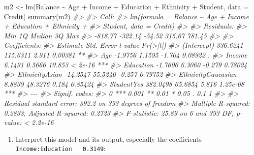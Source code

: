 \documentclass[
]{book}
\newenvironment{Shaded}{\begin{snugshade}}{\end{snugshade}}
\newcommand{\AttributeTok}[1]{\textcolor[rgb]{0.77,0.63,0.00}{#1}}
\newcommand{\CommentTok}[1]{\textcolor[rgb]{0.56,0.35,0.01}{\textit{#1}}}
\newcommand{\FunctionTok}[1]{\textcolor[rgb]{0.00,0.00,0.00}{#1}}
\newcommand{\NormalTok}[1]{#1}
\newcommand{\OtherTok}[1]{\textcolor[rgb]{0.56,0.35,0.01}{#1}}
\newcommand{\SpecialCharTok}[1]{\textcolor[rgb]{0.00,0.00,0.00}{#1}}
\providecommand{\tightlist}{%
  \setlength{\itemsep}{0pt}\setlength{\parskip}{0pt}}
\begin{document}
\begin{Shaded}
\begin{Highlighting}[]
\NormalTok{m2 }\OtherTok{\textless{}{-}} \FunctionTok{lm}\NormalTok{(Balance }\SpecialCharTok{\textasciitilde{}}\NormalTok{ Age }\SpecialCharTok{+}\NormalTok{ Income }\SpecialCharTok{+}\NormalTok{ Education }\SpecialCharTok{+}\NormalTok{ Ethnicity }\SpecialCharTok{+}\NormalTok{ Student, }\AttributeTok{data =}\NormalTok{ Credit)}
\FunctionTok{summary}\NormalTok{(m2)}
\CommentTok{\#\textgreater{} }
\CommentTok{\#\textgreater{} Call:}
\CommentTok{\#\textgreater{} lm(formula = Balance \textasciitilde{} Age + Income + Education + Ethnicity + }
\CommentTok{\#\textgreater{}     Student, data = Credit)}
\CommentTok{\#\textgreater{} }
\CommentTok{\#\textgreater{} Residuals:}
\CommentTok{\#\textgreater{}     Min      1Q  Median      3Q     Max }
\CommentTok{\#\textgreater{} {-}818.77 {-}322.14  {-}54.52  315.67  781.45 }
\CommentTok{\#\textgreater{} }
\CommentTok{\#\textgreater{} Coefficients:}
\CommentTok{\#\textgreater{}                    Estimate Std. Error t value Pr(\textgreater{}|t|)    }
\CommentTok{\#\textgreater{} (Intercept)        336.6241   115.6311   2.911  0.00381 ** }
\CommentTok{\#\textgreater{} Age                 {-}1.9756     1.1595  {-}1.704  0.08922 .  }
\CommentTok{\#\textgreater{} Income               6.1491     0.5666  10.853  \textless{} 2e{-}16 ***}
\CommentTok{\#\textgreater{} Education           {-}1.7606     6.3060  {-}0.279  0.78024    }
\CommentTok{\#\textgreater{} EthnicityAsian     {-}14.2547    55.5240  {-}0.257  0.79752    }
\CommentTok{\#\textgreater{} EthnicityCaucasian   8.8839    48.3276   0.184  0.85424    }
\CommentTok{\#\textgreater{} StudentYes         382.0498    65.6854   5.816 1.25e{-}08 ***}
\CommentTok{\#\textgreater{} {-}{-}{-}}
\CommentTok{\#\textgreater{} Signif. codes:  }
\CommentTok{\#\textgreater{} 0 \textquotesingle{}***\textquotesingle{} 0.001 \textquotesingle{}**\textquotesingle{} 0.01 \textquotesingle{}*\textquotesingle{} 0.05 \textquotesingle{}.\textquotesingle{} 0.1 \textquotesingle{} \textquotesingle{} 1}
\CommentTok{\#\textgreater{} }
\CommentTok{\#\textgreater{} Residual standard error: 392.2 on 393 degrees of freedom}
\CommentTok{\#\textgreater{} Multiple R{-}squared:  0.2833, Adjusted R{-}squared:  0.2723 }
\CommentTok{\#\textgreater{} F{-}statistic: 25.89 on 6 and 393 DF,  p{-}value: \textless{} 2.2e{-}16}
\end{Highlighting}
\end{Shaded}

\begin{enumerate}
\def\labelenumi{\arabic{enumi}.}
\setcounter{enumi}{5}
\tightlist
\item
  Interpret this model and its output, especially the coefficients \texttt{Income:Education\ \ \ 0.3149}:
\end{enumerate}
\end{document}
